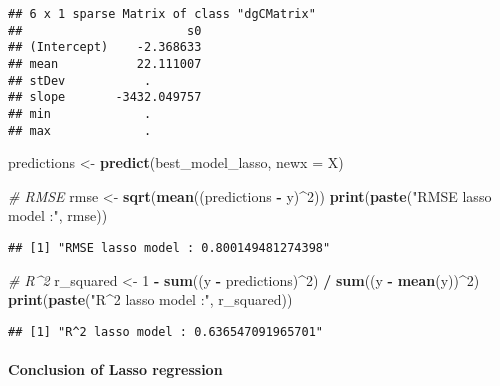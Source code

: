 \documentclass[
]{article}
\newenvironment{Shaded}{\begin{snugshade}}{\end{snugshade}}
\newcommand{\AttributeTok}[1]{\textcolor[rgb]{0.13,0.29,0.53}{#1}}
\newcommand{\CommentTok}[1]{\textcolor[rgb]{0.56,0.35,0.01}{\textit{#1}}}
\newcommand{\DecValTok}[1]{\textcolor[rgb]{0.00,0.00,0.81}{#1}}
\newcommand{\FunctionTok}[1]{\textcolor[rgb]{0.13,0.29,0.53}{\textbf{#1}}}
\newcommand{\NormalTok}[1]{#1}
\newcommand{\OtherTok}[1]{\textcolor[rgb]{0.56,0.35,0.01}{#1}}
\newcommand{\SpecialCharTok}[1]{\textcolor[rgb]{0.81,0.36,0.00}{\textbf{#1}}}
\newcommand{\StringTok}[1]{\textcolor[rgb]{0.31,0.60,0.02}{#1}}
\begin{document}
\begin{verbatim}
## 6 x 1 sparse Matrix of class "dgCMatrix"
##                       s0
## (Intercept)    -2.368633
## mean           22.111007
## stDev           .       
## slope       -3432.049757
## min             .       
## max             .
\end{verbatim}

\begin{Shaded}
\begin{Highlighting}[]
\NormalTok{predictions }\OtherTok{\textless{}{-}} \FunctionTok{predict}\NormalTok{(best\_model\_lasso, }\AttributeTok{newx =}\NormalTok{ X)}

\CommentTok{\# RMSE}
\NormalTok{rmse }\OtherTok{\textless{}{-}} \FunctionTok{sqrt}\NormalTok{(}\FunctionTok{mean}\NormalTok{((predictions }\SpecialCharTok{{-}}\NormalTok{ y)}\SpecialCharTok{\^{}}\DecValTok{2}\NormalTok{)) }
\FunctionTok{print}\NormalTok{(}\FunctionTok{paste}\NormalTok{(}\StringTok{"RMSE lasso model :"}\NormalTok{, rmse))}
\end{Highlighting}
\end{Shaded}

\begin{verbatim}
## [1] "RMSE lasso model : 0.800149481274398"
\end{verbatim}

\begin{Shaded}
\begin{Highlighting}[]
\CommentTok{\# R\^{}2}
\NormalTok{r\_squared }\OtherTok{\textless{}{-}} \DecValTok{1} \SpecialCharTok{{-}} \FunctionTok{sum}\NormalTok{((y }\SpecialCharTok{{-}}\NormalTok{ predictions)}\SpecialCharTok{\^{}}\DecValTok{2}\NormalTok{) }\SpecialCharTok{/} \FunctionTok{sum}\NormalTok{((y }\SpecialCharTok{{-}} \FunctionTok{mean}\NormalTok{(y))}\SpecialCharTok{\^{}}\DecValTok{2}\NormalTok{)}
\FunctionTok{print}\NormalTok{(}\FunctionTok{paste}\NormalTok{(}\StringTok{"R\^{}2 lasso model :"}\NormalTok{, r\_squared))}
\end{Highlighting}
\end{Shaded}

\begin{verbatim}
## [1] "R^2 lasso model : 0.636547091965701"
\end{verbatim}

\paragraph{Conclusion of Lasso
regression}\label{conclusion-of-lasso-regression}
\end{document}

